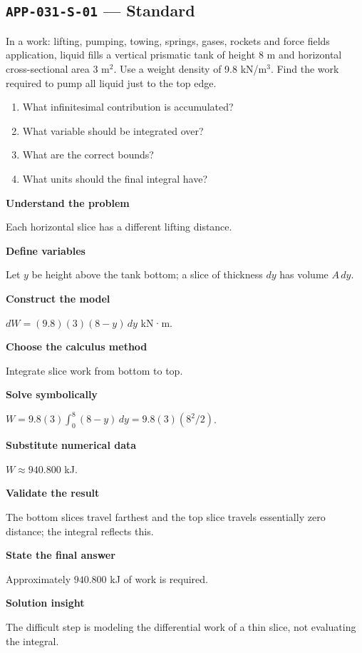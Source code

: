 \documentclass[11pt]{book}
\newcommand{\pid}[1]{\texttt{#1}}
\begin{document}
\subsection*{\pid{APP-031-S-01} — Standard}
\begin{problembox}
In a work: lifting, pumping, towing, springs, gases, rockets and force fields application, liquid fills a vertical prismatic tank of height 8 m and horizontal cross-sectional area 3 m$^2$. Use a weight density of 9.8 kN/m$^3$. Find the work required to pump all liquid just to the top edge.
\end{problembox}
\begin{promptbox}\begin{enumerate}
\item What infinitesimal contribution is accumulated?
\item What variable should be integrated over?
\item What are the correct bounds?
\item What units should the final integral have?
\end{enumerate}\end{promptbox}
\begin{solutionbox}
\textbf{Understand the problem}\par Each horizontal slice has a different lifting distance.\par\medskip
\textbf{Define variables}\par Let $y$ be height above the tank bottom; a slice of thickness $dy$ has volume $A\,dy$.\par\medskip
\textbf{Construct the model}\par $dW=(9.8)(3)(8-y)\,dy$ kN·m.\par\medskip
\textbf{Choose the calculus method}\par Integrate slice work from bottom to top.\par\medskip
\textbf{Solve symbolically}\par $W=9.8(3)\int_0^{8}(8-y)\,dy=9.8(3)(8^2/2)$.\par\medskip
\textbf{Substitute numerical data}\par $W\approx 940.800$ kJ.\par\medskip
\textbf{Validate the result}\par The bottom slices travel farthest and the top slice travels essentially zero distance; the integral reflects this.\par\medskip
\textbf{State the final answer}\par Approximately $940.800$ kJ of work is required.\par\medskip
\textbf{Solution insight}\par The difficult step is modeling the differential work of a thin slice, not evaluating the integral.\par\medskip
\end{solutionbox}
\end{document}

